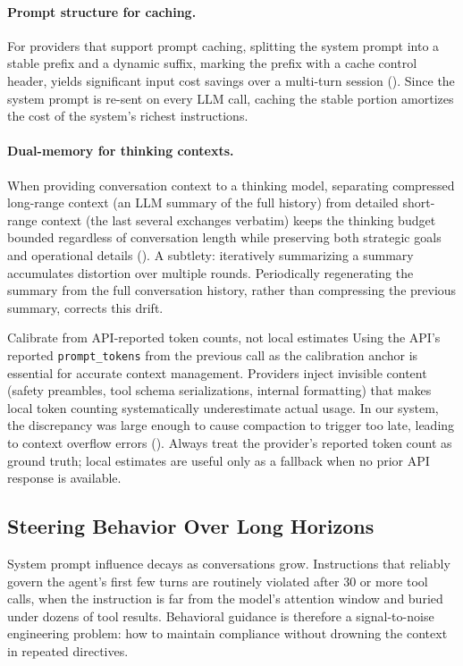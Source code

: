 \paragraph{Prompt structure for caching.} For providers that support prompt caching, splitting the system prompt into a stable prefix and a dynamic suffix, marking the prefix with a cache control header, yields significant input cost savings over a multi-turn session (). Since the system prompt is re-sent on every LLM call, caching the stable portion amortizes the cost of the system's richest instructions.

\paragraph{Dual-memory for thinking contexts.} When providing conversation context to a thinking model, separating compressed long-range context (an LLM summary of the full history) from detailed short-range context (the last several exchanges verbatim) keeps the thinking budget bounded regardless of conversation length while preserving both strategic goals and operational details (). A subtlety: iteratively summarizing a summary accumulates distortion over multiple rounds. Periodically regenerating the summary from the full conversation history, rather than compressing the previous summary, corrects this drift.

\begin{lessonbox}{Calibrate from API-reported token counts, not local estimates}
Using the API's reported \texttt{prompt\_tokens} from the previous call as the calibration anchor is essential for accurate context management. Providers inject invisible content (safety preambles, tool schema serializations, internal formatting) that makes local token counting systematically underestimate actual usage. In our system, the discrepancy was large enough to cause compaction to trigger too late, leading to context overflow errors (). Always treat the provider's reported token count as ground truth; local estimates are useful only as a fallback when no prior API response is available.
\end{lessonbox}

\subsection{Steering Behavior Over Long Horizons}

System prompt influence decays as conversations grow. Instructions that reliably govern the agent's first few turns are routinely violated after 30 or more tool calls, when the instruction is far from the model's attention window and buried under dozens of tool results. Behavioral guidance is therefore a signal-to-noise engineering problem: how to maintain compliance without drowning the context in repeated directives.

